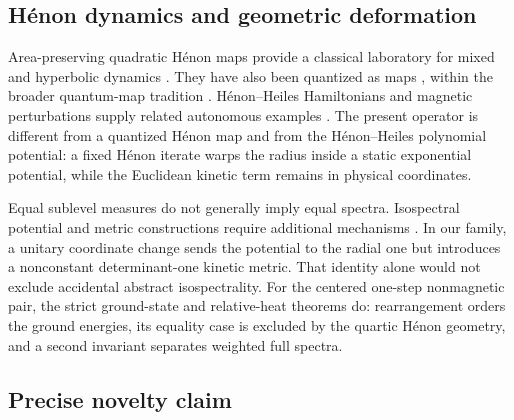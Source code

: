 \subsection{H\'enon dynamics and geometric deformation}

Area-preserving quadratic H\'enon maps provide a classical laboratory for
mixed and hyperbolic dynamics \citep{Henon1969,DevaneyNitecki1979}.
They have also been quantized as maps \citep{FornaessWeickert2000}, within the
broader quantum-map tradition \citep{BerryEtAl1979}.  H\'enon--Heiles
Hamiltonians and magnetic perturbations supply related autonomous examples
\citep{HenonHeiles1964,BrackEtAl1993,BrackEtAl1995}.  The present operator is
different from a quantized H\'enon map and from the H\'enon--Heiles
polynomial potential: a fixed H\'enon iterate warps the radius inside a static
exponential potential, while the Euclidean kinetic term remains in physical
coordinates.

Equal sublevel measures do not generally imply equal spectra.  Isospectral
potential and metric constructions require additional mechanisms
\citep{GordonSchueth2003,DharEtAl2003}.  In our family, a unitary coordinate
change sends the potential to the radial one but introduces a nonconstant
determinant-one kinetic metric.  That identity alone would not exclude
accidental abstract isospectrality.  For the centered one-step nonmagnetic
pair, the strict ground-state and relative-heat theorems do: rearrangement
orders the ground energies, its equality case is excluded by the quartic
H\'enon geometry, and a second invariant separates weighted full spectra.

\subsection{Precise novelty claim}

